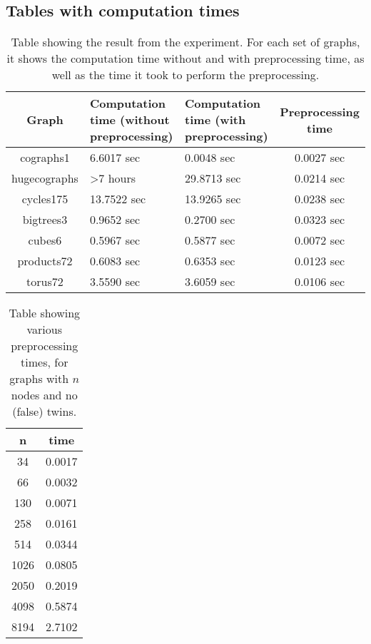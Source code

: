 \documentclass[twoside]{article}
\theoremstyle{definition}
\theoremstyle{plain}
\begin{document}
\begin{appendices}
\section{Tables with computation times}
\begin{table}[h]\centering
\begin{tabular}{c|C{0.3\textwidth}|C{0.3\textwidth}|c}
Graph & Computation time (without preprocessing) & Computation time (with preprocessing) & Preprocessing time \\
\hline
cographs1 & 6.6017 sec & 0.0048 sec & 0.0027 sec \\
hugecographs & >7 hours & 29.8713 sec & 0.0214 sec \\
cycles175 & 13.7522 sec & 13.9265 sec & 0.0238 sec\\
bigtrees3 & 0.9652 sec & 0.2700 sec & 0.0323 sec\\
cubes6 & 0.5967 sec & 0.5877 sec & 0.0072 sec\\
products72 & 0.6083 sec & 0.6353 sec & 0.0123 sec\\
torus72 & 3.5590 sec & 3.6059 sec & 0.0106 sec\\
\end{tabular}
\caption{Table showing the result from the experiment. For each set of graphs, it shows the computation time without and with preprocessing time, as well as the time it took to perform the preprocessing.}
\label{table:results}
\end{table}
\begin{table}[h]\centering

\begin{tabular}{c|c}
n & time \\
\hline
34 & 0.0017\\
66 & 0.0032\\
130 & 0.0071\\
258 & 0.0161\\
514 & 0.0344\\
1026 & 0.0805\\
2050 & 0.2019\\
4098 & 0.5874\\
8194 & 2.7102

\end{tabular}
\caption{Table showing various preprocessing times, for graphs with $n$ nodes and no (false) twins.}
\label{table:results2}
\end{table}
\end{appendices}
\end{document}
